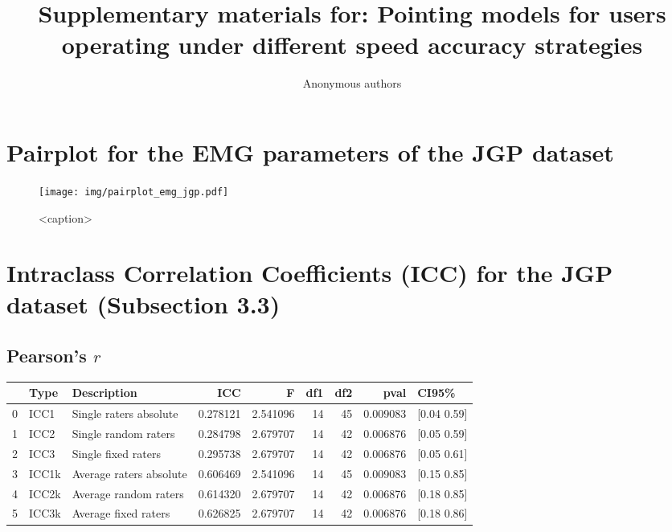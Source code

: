 \documentclass{article}
\title{Supplementary materials for: Pointing models for users operating under
different speed accuracy strategies }
\author{Anonymous authors}
\date{}
\begin{document}
\maketitle

\section{Pairplot for the EMG parameters of the JGP dataset}

\begin{figure}[htbp]
    \centering
    \texttt{[image: img/pairplot\_emg\_jgp.pdf]}
    \caption{<caption>}
    \label{<label>}
\end{figure}


\section{Intraclass Correlation Coefficients (ICC) for the JGP dataset (Subsection 3.3)}
\subsection{Pearson's $r$}
\begin{center}
    \begin{tabular}{lllrrrrrl}
        \toprule
          & Type  & Description             & ICC      & F        & df1 & df2 & pval     & CI95\%      \\
        \midrule
        0 & ICC1  & Single raters absolute  & 0.278121 & 2.541096 & 14  & 45  & 0.009083 & [0.04 0.59] \\
        1 & ICC2  & Single random raters    & 0.284798 & 2.679707 & 14  & 42  & 0.006876 & [0.05 0.59] \\
        2 & ICC3  & Single fixed raters     & 0.295738 & 2.679707 & 14  & 42  & 0.006876 & [0.05 0.61] \\
        3 & ICC1k & Average raters absolute & 0.606469 & 2.541096 & 14  & 45  & 0.009083 & [0.15 0.85] \\
        4 & ICC2k & Average random raters   & 0.614320 & 2.679707 & 14  & 42  & 0.006876 & [0.18 0.85] \\
        5 & ICC3k & Average fixed raters    & 0.626825 & 2.679707 & 14  & 42  & 0.006876 & [0.18 0.86] \\
        \bottomrule
    \end{tabular}
\end{center}
\end{document}
